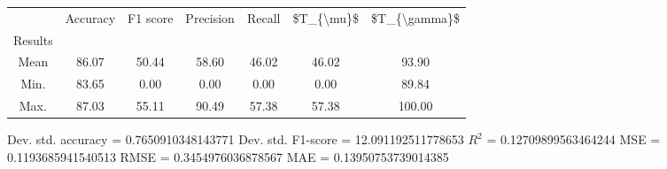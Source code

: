 \begin{tabular}{|c|c|c|c|c|c|c|}
\toprule
{} &  Accuracy &  F1 score &  Precision &  Recall &  \$T\_\{\textbackslash mu\}\$ &  \$T\_\{\textbackslash gamma\}\$ \\
Results &           &           &            &         &            &               \\
\hline
Mean    &     86.07 &     50.44 &      58.60 &   46.02 &      46.02 &         93.90 \\
Min.    &     83.65 &      0.00 &       0.00 &    0.00 &       0.00 &         89.84 \\
Max.    &     87.03 &     55.11 &      90.49 &   57.38 &      57.38 &        100.00 \\
\bottomrule
\end{tabular}

 Dev. std. accuracy = 0.7650910348143771
 Dev. std. F1-score = 12.091192511778653
 $R^2$ = 0.12709899563464244
 MSE = 0.1193685941540513
 RMSE = 0.3454976036878567
 MAE = 0.13950753739014385